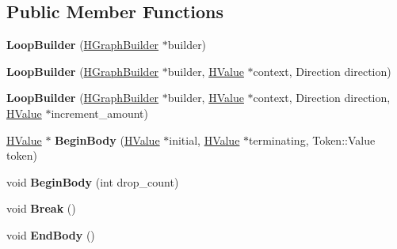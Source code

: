 \subsection*{Public Member Functions}
\begin{DoxyCompactItemize}
\item 
{\bfseries Loop\+Builder} (\hyperlink{classv8_1_1internal_1_1_h_graph_builder}{H\+Graph\+Builder} $\ast$builder)\hypertarget{classv8_1_1internal_1_1_h_graph_builder_1_1_loop_builder_a965eee11ecc403c958b7747bb11894cf}{}\label{classv8_1_1internal_1_1_h_graph_builder_1_1_loop_builder_a965eee11ecc403c958b7747bb11894cf}

\item 
{\bfseries Loop\+Builder} (\hyperlink{classv8_1_1internal_1_1_h_graph_builder}{H\+Graph\+Builder} $\ast$builder, \hyperlink{classv8_1_1internal_1_1_h_value}{H\+Value} $\ast$context, Direction direction)\hypertarget{classv8_1_1internal_1_1_h_graph_builder_1_1_loop_builder_af134c7657dcfb2e33895d623626f0e24}{}\label{classv8_1_1internal_1_1_h_graph_builder_1_1_loop_builder_af134c7657dcfb2e33895d623626f0e24}

\item 
{\bfseries Loop\+Builder} (\hyperlink{classv8_1_1internal_1_1_h_graph_builder}{H\+Graph\+Builder} $\ast$builder, \hyperlink{classv8_1_1internal_1_1_h_value}{H\+Value} $\ast$context, Direction direction, \hyperlink{classv8_1_1internal_1_1_h_value}{H\+Value} $\ast$increment\+\_\+amount)\hypertarget{classv8_1_1internal_1_1_h_graph_builder_1_1_loop_builder_a74d4d55a564dbe729c407a04600e067b}{}\label{classv8_1_1internal_1_1_h_graph_builder_1_1_loop_builder_a74d4d55a564dbe729c407a04600e067b}

\item 
\hyperlink{classv8_1_1internal_1_1_h_value}{H\+Value} $\ast$ {\bfseries Begin\+Body} (\hyperlink{classv8_1_1internal_1_1_h_value}{H\+Value} $\ast$initial, \hyperlink{classv8_1_1internal_1_1_h_value}{H\+Value} $\ast$terminating, Token\+::\+Value token)\hypertarget{classv8_1_1internal_1_1_h_graph_builder_1_1_loop_builder_a88389ae85770796002cace9161acd24b}{}\label{classv8_1_1internal_1_1_h_graph_builder_1_1_loop_builder_a88389ae85770796002cace9161acd24b}

\item 
void {\bfseries Begin\+Body} (int drop\+\_\+count)\hypertarget{classv8_1_1internal_1_1_h_graph_builder_1_1_loop_builder_ac4a223eaa668e3829c6086ea15bfa34a}{}\label{classv8_1_1internal_1_1_h_graph_builder_1_1_loop_builder_ac4a223eaa668e3829c6086ea15bfa34a}

\item 
void {\bfseries Break} ()\hypertarget{classv8_1_1internal_1_1_h_graph_builder_1_1_loop_builder_aceaf5cf399b18e0a142cd0e632944460}{}\label{classv8_1_1internal_1_1_h_graph_builder_1_1_loop_builder_aceaf5cf399b18e0a142cd0e632944460}

\item 
void {\bfseries End\+Body} ()\hypertarget{classv8_1_1internal_1_1_h_graph_builder_1_1_loop_builder_abe18eb8306aaf40d8c784badf3ec12fd}{}\label{classv8_1_1internal_1_1_h_graph_builder_1_1_loop_builder_abe18eb8306aaf40d8c784badf3ec12fd}

\end{DoxyCompactItemize}
